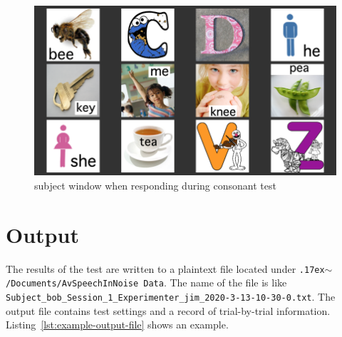 \documentclass[11pt,pdftex,letterpaper]{article}
\newcommand{\mytilde}{\raise.17ex\hbox{$\scriptstyle\mathtt{\sim}$}}
\begin{document}
\begin{figure}
\centering
\includegraphics[width = 0.9\linewidth]{consonant-response-window.png}
\caption{subject window when responding during consonant test}
\label{fig:consonant-response-window}
\end{figure}

\section{Output}
The results of the test are written to a plaintext file located under \texttt{\mytilde/Documents/AvSpeechInNoise Data}. The name of the file is like \texttt{Subject\_bob\_Session\_1\_Experimenter\_jim\_2020-3-13-10-30-0.txt}. The output file contains test settings and a record of trial-by-trial information. Listing~\ref{lst:example-output-file} shows an example.

\noindent\begin{minipage}{\textwidth}

\end{minipage}
\end{document}
